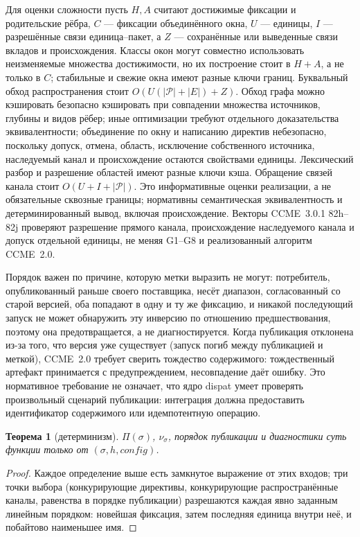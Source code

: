 \documentclass[sigconf,nonacm]{acmart}
\theoremstyle{acmplain}
\newtheorem{theorem}{Теорема}[section]
\theoremstyle{acmdefinition}
\theoremstyle{acmplain}
\begin{document}
Для оценки сложности пусть $H,A$ считают достижимые фиксации и родительские
рёбра, $C$ --- фиксации объединённого окна, $U$ --- единицы, $I$ ---
разрешённые связи единица--пакет, а $Z$ --- сохранённые или выведенные связи
вкладов и происхождения. Классы окон могут совместно использовать неизменяемые
множества достижимости, но их построение стоит в $H+A$, а не только в $C$;
стабильные и свежие окна имеют разные ключи границ. Буквальный обход
распространения стоит $O(U(|\mathcal P|+|E|)+Z)$. Обход графа можно кэшировать
безопасно кэшировать при совпадении множества источников, глубины и видов рёбер;
иные оптимизации требуют отдельного доказательства эквивалентности; объединение по
окну и написанию директив небезопасно, поскольку допуск, отмена, область,
исключение собственного источника, наследуемый канал и происхождение остаются
свойствами единицы. Лексический разбор и разрешение областей имеют разные ключи
кэша. Обращение связей канала стоит $O(U+I+|\mathcal P|)$. Это информативные
оценки реализации, а не обязательные сквозные границы; нормативны
семантическая эквивалентность и детерминированный вывод, включая происхождение.
Векторы CCME~3.0.1 82h--82j проверяют разрешение прямого канала,
происхождение наследуемого канала и допуск отдельной единицы, не меняя G1--G8 и
реализованный алгоритм CCME~2.0.

Порядок важен по причине, которую метки выразить не могут: потребитель, опубликованный
раньше своего поставщика, несёт диапазон, согласованный со старой
версией, оба попадают в одну и ту же фиксацию, и никакой последующий запуск не может обнаружить
эту инверсию по отношению предшествования, поэтому она предотвращается, а не диагностируется. Когда
публикация отклонена из-за того, что версия уже существует (запуск погиб
между публикацией и меткой), CCME~2.0 требует сверить тождество содержимого:
тождественный артефакт принимается с предупреждением, несовпадение даёт
ошибку. Это нормативное требование не означает, что ядро dispat умеет
проверять произвольный сценарий публикации: интеграция должна предоставить
идентификатор содержимого или идемпотентную операцию.

\begin{theorem}[детерминизм]
\label{thm:det}
$\Pi(\sigma)$, $\nu_\sigma$, порядок публикации и диагностики суть
функции только от $(\sigma, h, \mathit{config})$.
\end{theorem}
\begin{proof}
Каждое определение выше есть замкнутое выражение от этих входов; три
точки выбора (конкурирующие директивы, конкурирующие распространённые каналы,
равенства в порядке публикации) разрешаются каждая явно заданным линейным порядком: новейшая
фиксация, затем последняя единица внутри неё, и побайтово наименьшее имя.
\end{proof}
\end{document}
